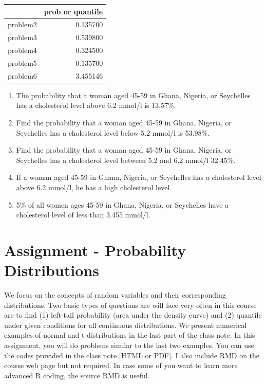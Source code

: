 \documentclass[
]{book}
\providecommand{\tightlist}{%
  \setlength{\itemsep}{0pt}\setlength{\parskip}{0pt}}
\begin{document}
\begin{tabular}{l|r}
\hline
  & prob or quantile\\
\hline
problem2 & 0.135700\\
\hline
problem3 & 0.539800\\
\hline
problem4 & 0.324500\\
\hline
problem5 & 0.135700\\
\hline
problem6 & 3.455146\\
\hline
\end{tabular}

\begin{enumerate}
\def\labelenumi{\arabic{enumi}.}
\setcounter{enumi}{1}
\tightlist
\item
  The probability that a woman aged 45-59 in Ghana, Nigeria, or Seychelles has a cholesterol level above 6.2 mmol/l is 13.57\%.
\item
  Find the probability that a woman aged 45-59 in Ghana, Nigeria, or Seychelles has a cholesterol level below 5.2 mmol/l is 53.98\%.
\item
  Find the probability that a woman aged 45-59 in Ghana, Nigeria, or Seychelles has a cholesterol level between 5.2 and 6.2 mmol/l 32.45\%.
\item
  If a woman aged 45-59 in Ghana, Nigeria, or Seychelles has a cholesterol level above 6.2 mmol/l, he has a high cholesterol level.
\item
  5\% of all women ages 45-59 in Ghana, Nigeria, or Seychelles have a cholesterol level of less than 3.455 mmol/l.
\end{enumerate}

\hypertarget{assignment---probability-distributions}{%
\section{Assignment - Probability Distributions}\label{assignment---probability-distributions}}

We focus on the concepts of random variables and their corresponding distributions. Two basic types of questions are will face very often in this course are to find (1) left-tail probability (area under the density curve) and (2) quantile under given conditions for all continuous distributions. We present numerical examples of normal and t distributions in the last part of the class note. In this assignment, you will do problems similar to the last two examples. You can use the codes provided in the class note {[}HTML or PDF{]}. I also include RMD on the course web page but not required. In case some of you want to learn more advanced R coding, the source RMD is useful.
\end{document}
